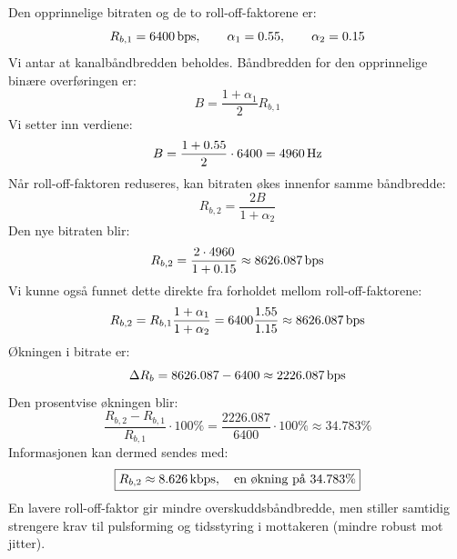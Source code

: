 Den opprinnelige bitraten og de to roll-off-faktorene er:
\[
    R_{b,1}=6400\,\mathrm{bps},\qquad
    \alpha_1=0.55,\qquad\alpha_2=0.15
\]
Vi antar at kanalbåndbredden beholdes. Båndbredden for den opprinnelige binære overføringen er:
\[
    B=\frac{1+\alpha_1}{2}R_{b,1}
\]
Vi setter inn verdiene:
\[
    B=\frac{1+0.55}{2}\cdot6400=4960\,\mathrm{Hz}
\]
Når roll-off-faktoren reduseres, kan bitraten økes innenfor samme båndbredde:
\[
    R_{b,2}=\frac{2B}{1+\alpha_2}
\]
Den nye bitraten blir:
\[
    R_{b,2}=\frac{2\cdot4960}{1+0.15}
           \approx8626.087\,\mathrm{bps}
\]
Vi kunne også funnet dette direkte fra forholdet mellom roll-off-faktorene:
\[
    R_{b,2}=R_{b,1}\frac{1+\alpha_1}{1+\alpha_2}
           =6400\frac{1.55}{1.15}
           \approx8626.087\,\mathrm{bps}
\]
Økningen i bitrate er:
\[
    \Delta R_b=8626.087-6400\approx2226.087\,\mathrm{bps}
\]
Den prosentvise økningen blir:
\[
    \frac{R_{b,2}-R_{b,1}}{R_{b,1}}\cdot100\%
       =\frac{2226.087}{6400}\cdot100\%
       \approx34.783\%
\]
Informasjonen kan dermed sendes med:
\[
    \boxed{R_{b,2}\approx8.626\,\mathrm{kbps},
    \quad\text{en økning på }34.783\%}
\]
En lavere roll-off-faktor gir mindre overskuddsbåndbredde, men stiller samtidig strengere krav til pulsforming og tidsstyring i mottakeren (mindre robust mot jitter).
